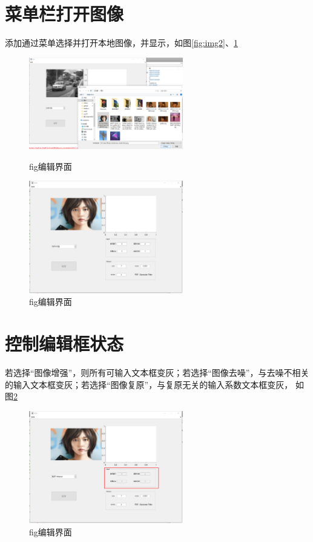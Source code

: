 \documentclass[lang=cn]{elegantpaper}
\begin{document}
\section{菜单栏打开图像}
\par 添加通过菜单选择并打开本地图像，并显示，如图\ref{fig:img2}、\ref{fig:img3}
    \begin{figure}[htbp]
        \centering
        \includegraphics[width=0.6\textwidth]{img2.png}
        \caption{fig编辑界面\label{fig:img2}}
        
        \includegraphics[width=0.6\textwidth]{img3.png}
        \caption{fig编辑界面\label{fig:img3}}
    \end{figure}

\section{控制编辑框状态}
\par 若选择“图像增强”，则所有可输入文本框变灰；若选择“图像去噪”，与去噪不相关的输入文本框变灰；若选择“图像复原”，与复原无关的输入系数文本框变灰，
如图\ref{fig:img4}
\begin{figure}[htbp]
    \centering
    \includegraphics[width=0.6\textwidth]{img4.png}
    \caption{fig编辑界面\label{fig:img4}}
\end{figure}
\end{document}
